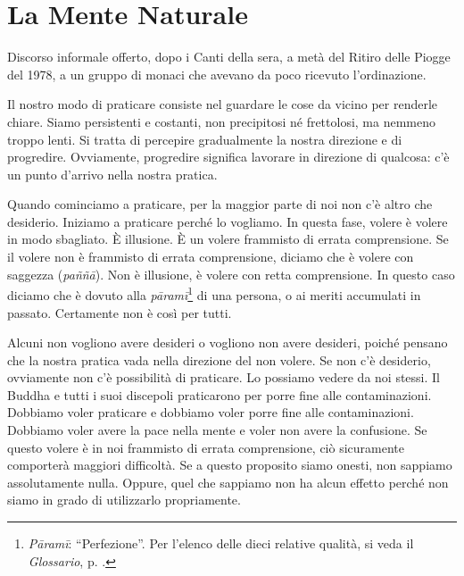 \chapter{La Mente Naturale}

\begin{openingQuote}
  \centering

  Discorso informale offerto, dopo i Canti della sera, a metà del Ritiro delle
  Piogge del 1978, a un gruppo di monaci che avevano da poco ricevuto
  l'ordinazione.
\end{openingQuote}

Il nostro modo di praticare consiste nel guardare le cose da vicino per
renderle chiare. Siamo persistenti e costanti, non precipitosi né
frettolosi, ma nemmeno troppo lenti. Si tratta di percepire gradualmente
la nostra direzione e di progredire. Ovviamente, progredire significa
lavorare in direzione di qualcosa: c'è un punto d'arrivo nella nostra
pratica.

Quando cominciamo a praticare, per la maggior parte di noi non c'è altro
che desiderio. Iniziamo a praticare perché lo vogliamo. In questa fase,
volere è volere in modo sbagliato. È illusione. È un volere frammisto di
errata comprensione. Se il volere non è frammisto di errata
comprensione, diciamo che è volere con saggezza (\emph{paññā}). Non è
illusione, è volere con retta comprensione. In questo caso diciamo che è
dovuto alla \emph{pāramī}\footnote{\emph{Pāramī}: ``Perfezione''. Per
  l'elenco delle dieci relative qualità, si veda il \emph{Glossario}, p. \pageref{glossary-parami}.}
di una persona, o ai meriti accumulati in passato. Certamente non è così
per tutti.

Alcuni non vogliono avere desideri o vogliono non avere desideri, poiché
pensano che la nostra pratica vada nella direzione del non volere. Se
non c'è desiderio, ovviamente non c'è possibilità di praticare. Lo
possiamo vedere da noi stessi. Il Buddha e tutti i suoi discepoli
praticarono per porre fine alle contaminazioni. Dobbiamo voler praticare
e dobbiamo voler porre fine alle contaminazioni. Dobbiamo voler avere la
pace nella mente e voler non avere la confusione. Se questo volere è in
noi frammisto di errata comprensione, ciò sicuramente comporterà
maggiori difficoltà. Se a questo proposito siamo onesti, non sappiamo
assolutamente nulla. Oppure, quel che sappiamo non ha alcun effetto
perché non siamo in grado di utilizzarlo propriamente.

